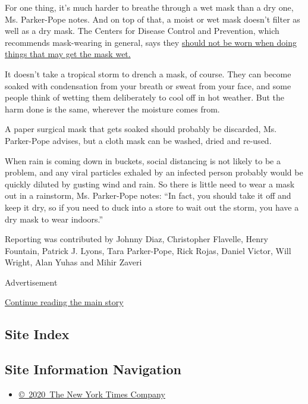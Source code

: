 For one thing, it's much harder to breathe through a wet mask than a dry
one, Ms. Parker-Pope notes. And on top of that, a moist or wet mask
doesn't filter as well as a dry mask. The Centers for Disease Control
and Prevention, which recommends mask-wearing in general, says they
\href{https://www.cdc.gov/coronavirus/2019-ncov/prevent-getting-sick/cloth-face-cover-guidance.html}{should
not be worn when doing things that may get the mask wet. }

It doesn't take a tropical storm to drench a mask, of course. They can
become soaked with condensation from your breath or sweat from your
face, and some people think of wetting them deliberately to cool off in
hot weather. But the harm done is the same, wherever the moisture comes
from.

A paper surgical mask that gets soaked should probably be discarded, Ms.
Parker-Pope advises, but a cloth mask can be washed, dried and re-used.

When rain is coming down in buckets, social distancing is not likely to
be a problem, and any viral particles exhaled by an infected person
probably would be quickly diluted by gusting wind and rain. So there is
little need to wear a mask out in a rainstorm, Ms. Parker-Pope notes:
``In fact, you should take it off and keep it dry, so if you need to
duck into a store to wait out the storm, you have a dry mask to wear
indoors.''

Reporting was contributed by Johnny Diaz, Christopher Flavelle, Henry
Fountain, Patrick J. Lyons, Tara Parker-Pope, Rick Rojas, Daniel Victor,
Will Wright, Alan Yuhas and Mihir Zaveri

Advertisement

\protect\hyperlink{after-bottom}{Continue reading the main story}

\hypertarget{site-index}{%
\subsection{Site Index}\label{site-index}}

\hypertarget{site-information-navigation}{%
\subsection{Site Information
Navigation}\label{site-information-navigation}}

\begin{itemize}
\tightlist
\item
  \href{https://help.nytimes.com/hc/en-us/articles/115014792127-Copyright-notice}{©~2020~The
  New York Times Company}
\end{itemize}

